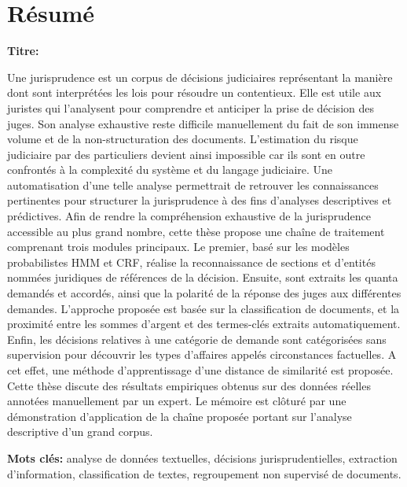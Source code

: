 \chapter*{Résumé}
\textbf{Titre:} \textsc{\titlefr}

Une jurisprudence est un corpus de décisions judiciaires représentant la manière dont sont interprétées les lois pour résoudre un contentieux. Elle est utile aux juristes qui l'analysent pour comprendre et anticiper la prise de décision des juges. Son analyse exhaustive reste difficile manuellement du fait de son immense volume et de la non-structuration des documents. L'estimation du risque judiciaire par des particuliers devient ainsi impossible car ils sont en outre confrontés à la complexité du système et du langage judiciaire. Une automatisation d'une telle analyse permettrait de retrouver les connaissances pertinentes pour structurer la jurisprudence à des fins d'analyses descriptives et prédictives.  
Afin de rendre la compréhension exhaustive de la jurisprudence accessible au plus grand nombre, cette thèse propose une chaîne de traitement comprenant trois modules principaux. Le premier, basé sur les modèles probabilistes HMM et CRF, réalise la reconnaissance de sections et d'entités nommées juridiques de références de la décision. Ensuite, sont extraits les quanta demandés et accordés, ainsi que la polarité de la réponse des juges aux différentes demandes. L'approche proposée est basée sur la classification de documents, et la proximité entre les sommes d'argent et des termes-clés extraits automatiquement. Enfin, les décisions relatives à une catégorie de demande sont catégorisées sans supervision pour découvrir les types d'affaires appelés circonstances factuelles. A cet effet, une méthode d'apprentissage d'une distance de similarité est proposée.
Cette thèse discute des résultats empiriques obtenus sur des données réelles annotées manuellement par un expert. Le mémoire est clôturé par une démonstration d'application de la chaîne proposée portant sur l'analyse descriptive d'un grand corpus.

\textbf{Mots clés:} analyse de données textuelles, décisions jurisprudentielles, extraction d'information, classification de textes, regroupement non supervisé de documents.

